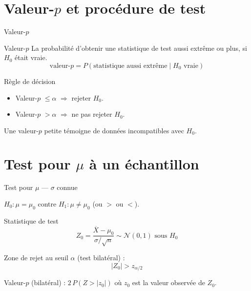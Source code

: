 \documentclass{BeamerTemplate}
\begin{document}
\section{Valeur-\texorpdfstring{$p$}{p} et procédure de test}

\begin{frame}[t]{Valeur-$p$}

\begin{Boite}{Valeur-$p$}
La probabilité d'obtenir une statistique de test aussi extrême ou plus, si $H_0$ était vraie.
$$\text{valeur-}p = P(\text{statistique aussi extrême} \mid H_0 \text{ vraie})$$
\end{Boite}

\medskip
\begin{Boite}{Règle de décision}
\begin{itemize}
  \item Valeur-$p$ $\le \alpha$ $\Rightarrow$ \alert{rejeter $H_0$}.
  \item Valeur-$p$ $> \alpha$ $\Rightarrow$ ne pas rejeter $H_0$.
\end{itemize}
\end{Boite}

\medskip
Une valeur-$p$ petite témoigne de données \alert{incompatibles} avec $H_0$.

\end{frame}

\section{Test pour \texorpdfstring{$\mu$}{mu} à un échantillon}

\begin{frame}[t]{Test pour $\mu$ — $\sigma$ connue}

$H_0 : \mu = \mu_0$ contre $H_1 : \mu \ne \mu_0$ (ou $>$ ou $<$).

\bigskip
\begin{Boite}{Statistique de test}
$$Z_0 = \frac{\overline{X} - \mu_0}{\sigma/\sqrt{n}} \sim \mathcal{N}(0,1) \text{ sous } H_0$$
\end{Boite}

\medskip
Zone de rejet au seuil $\alpha$ (test bilatéral) :
$$|Z_0| > z_{\alpha/2}$$

\medskip
Valeur-$p$ (bilatéral) : $2\,P(Z > |z_0|)$ où $z_0$ est la valeur observée de $Z_0$.

\end{frame}
\end{document}
